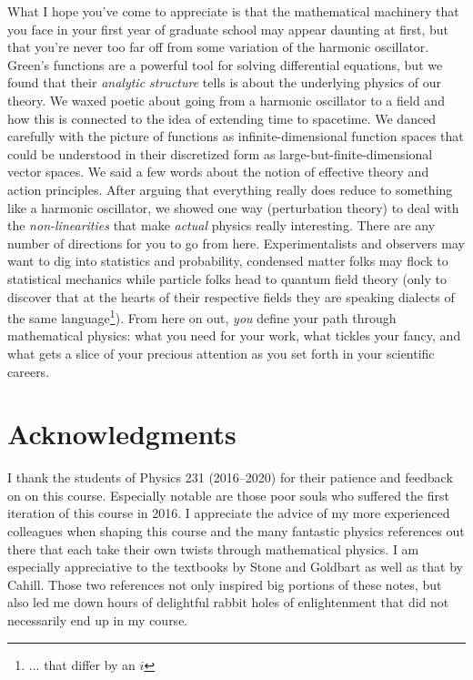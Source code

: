 \documentclass[12pt]{article}
\begin{document}
What I hope you've come to appreciate is that the mathematical machinery that you face in your first year of graduate school may appear daunting at first, but that you're never too far off from some variation of the harmonic oscillator. Green's functions are a powerful tool for solving differential equations, but we found that their \emph{analytic structure} tells is about the underlying physics of our theory. We waxed poetic about going from a harmonic oscillator to a field and how this is connected to the idea of extending time to spacetime. We danced carefully with the picture of functions as infinite-dimensional function spaces that could be understood in their discretized form as large-but-finite-dimensional vector spaces. We said a few words about the notion of effective theory and action principles. After arguing that everything really does reduce to something like a harmonic oscillator, we showed one way (perturbation theory) to deal with the \emph{non-linearities} that make \emph{actual} physics really interesting. There are any number of directions for you to go from here. Experimentalists and observers may want to dig into statistics and probability, condensed matter folks may flock to statistical mechanics while particle folks head to quantum field theory (only to discover that at the hearts of their respective fields they are speaking dialects of the same language\footnote{... that differ by an $i$}). From here on out, \emph{you} define your path through mathematical physics: what you need for your work, what tickles your fancy, and what gets a slice of your precious attention as you set forth in your scientific careers.



\section*{Acknowledgments}
%
I thank the students of Physics 231 (2016--2020) for their patience and feedback on on this course. Especially notable are those poor souls who suffered the first iteration of this course in 2016. I appreciate the advice of my more experienced colleagues when shaping this course and the many fantastic physics references out there that each take their own twists through mathematical physics. I am especially appreciative to the textbooks by Stone and Goldbart as well as that by Cahill. Those two references not only inspired big portions of these notes, but also led me down hours of delightful rabbit holes of enlightenment that did not necessarily end up in my course.
\end{document}
